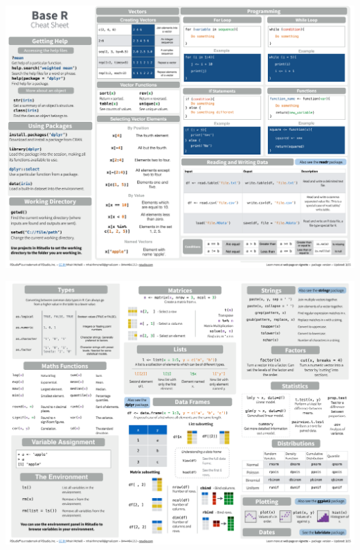\documentclass[]{book}
\begin{document}
\includegraphics{figures/cheatsheet1.png}

\includegraphics{figures/cheatsheet2.png}


\end{document}
